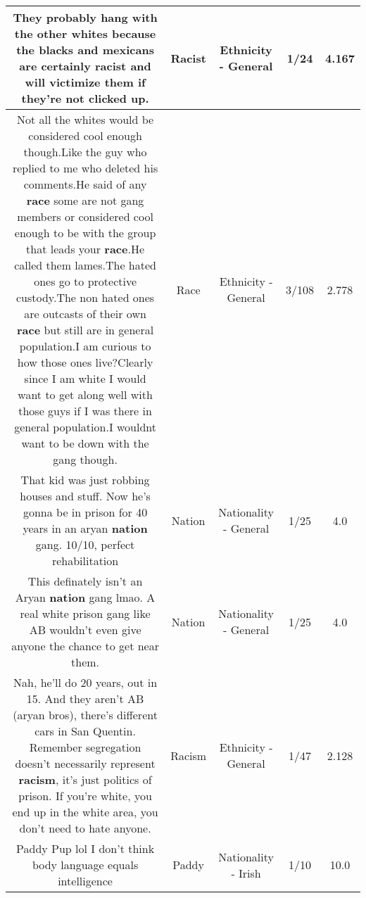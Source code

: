 \documentclass[11pt]{article}
\newlength\mylength
\begin{document}
\begin{center}
\begin{longtable}{|C{.65\mylength}|C{.30\mylength}|C{.12\mylength}|C{.12\mylength}|C{.12\mylength}|}
  \small They probably hang with the other whites because the blacks and mexicans are certainly \textbf{racist} and will victimize them if they're not clicked up.\normalsize   & Racist & Ethnicity - General & 1/24 & 4.167 \\  \hline
  \small Not all the whites would be considered cool enough though.Like the guy who replied to me who deleted his comments.He said of any \textbf{race} some are not gang members or considered cool enough to be with the group that leads your \textbf{race}.He called them lames.The hated ones go to protective custody.The non hated ones are outcasts of their own \textbf{race} but still are in general population.I am curious to how those ones live?Clearly since I am white I would want to get along well with those guys if I was there in general population.I wouldnt want to be down with the gang though.\normalsize   & Race & Ethnicity - General & 3/108 & 2.778 \\  \hline
  \small That kid was just robbing houses and stuff. Now he's gonna be in prison for 40 years in an aryan \textbf{nation} gang. 10/10, perfect rehabilitation\normalsize   & Nation & Nationality - General & 1/25 & 4.0 \\  \hline
  \small This definately isn't an Aryan \textbf{nation} gang lmao. A real white prison gang like AB wouldn't even give anyone the chance to get near them.\normalsize   & Nation & Nationality - General & 1/25 & 4.0 \\  \hline
  \small Nah, he'll do 20 years, out in 15.   And they aren't AB (aryan bros), there's different cars in San Quentin.  Remember segregation doesn't necessarily represent \textbf{racism}, it's just politics of prison.  If you're white, you end up in the white area, you don't need to hate anyone.\normalsize   & Racism & Ethnicity - General & 1/47 & 2.128 \\  \hline
  \small Paddy Pup lol I don't think body language equals intelligence\normalsize   & Paddy & Nationality - Irish & 1/10 & 10.0 \\  \hline

\end{longtable}
\end{center}
\end{document}
